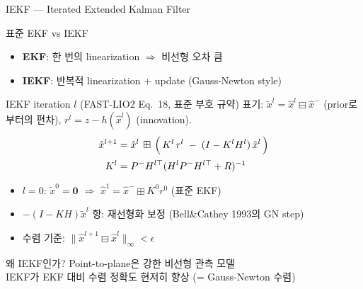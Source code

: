 \begin{frame}[shrink=15]{IEKF — Iterated Extended Kalman Filter}
  \begin{block}{표준 EKF vs IEKF}
    \begin{itemize}
      \item \textbf{EKF}: 한 번의 linearization $\Rightarrow$ 비선형 오차 큼
      \item \textbf{IEKF}: 반복적 linearization + update (Gauss-Newton style)
    \end{itemize}
  \end{block}
  \pause
  \begin{block}{IEKF iteration $l$ (FAST-LIO2 Eq.~18, 표준 부호 규약)}
    \footnotesize 표기: $\tilde{x}^{l} = \hat{x}^{l} \boxminus \hat{x}^{-}$ (prior로부터의 편차),\;
    $r^{l} = z - h(\hat{x}^{l})$ (innovation).
    \begin{align*}
      \hat{x}^{l+1} &= \hat{x}^{l} \,\boxplus\,
      \Bigl(\,K^{l}\,r^{l} \;-\; (I - K^{l} H^{l})\,\tilde{x}^{l}\,\Bigr)\\[2pt]
      K^{l} &= P^{-} H^{l\top}(H^{l} P^{-} H^{l\top} + R)^{-1}
    \end{align*}
    \begin{itemize}\footnotesize
      \item $l=0$: $\tilde{x}^{0}=\mathbf{0}$ $\Rightarrow$ $\hat{x}^{1} = \hat{x}^{-} \boxplus K^{0}r^{0}$ (표준 EKF)
      \item $-(I-KH)\tilde{x}^{l}$ 항: 재선형화 보정 (Bell\&Cathey 1993의 GN step)
      \item 수렴 기준: $\|\hat{x}^{l+1} \boxminus \hat{x}^{l}\|_\infty < \epsilon$
    \end{itemize}
  \end{block}
  \pause
  \begin{alertblock}{왜 IEKF인가?}
    Point-to-plane은 강한 비선형 관측 모델\\
    IEKF가 EKF 대비 수렴 정확도 현저히 향상 (= Gauss-Newton 수렴)
  \end{alertblock}
\end{frame}

